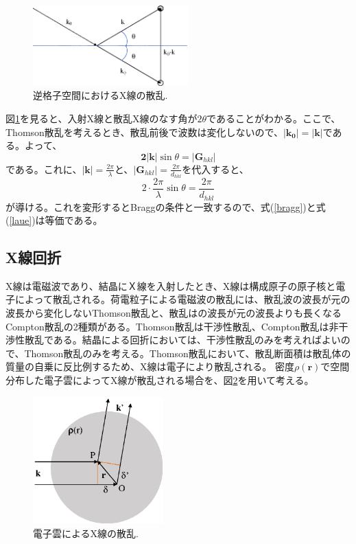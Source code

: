 \documentclass[11pt,a4j,uplatex]{jsarticle}
\begin{document}
\begin{figure}[htb]
 \centering
 \includegraphics[clip,width=6cm]{hasuu.eps}
 \caption{逆格子空間におけるX線の散乱.}
 \label{hasuu}
\end{figure}

\newpage%
図\ref{hasuu}を見ると、入射X線と散乱X線のなす角が$2\theta$であることがわかる。ここで、Thomson散乱を考えるとき、散乱前後で波数は変化しないので、$\bm{|k_0|=|k|}$である。よって、
\begin{equation}
 \bm{2|k|}\sin\theta=|\bm{G}_{hkl}|
 \nonumber
\end{equation}
である。これに、$\bm{|k|}=\frac{2\pi}{\lambda}$と、$|\bm{G}_{hkl}|=\frac{2\pi}{d_{hkl}}$を代入すると、
\begin{equation}
 2\cdot\frac{2\pi}{\lambda}\sin\theta=\frac{2\pi}{d_{hkl}}
 \nonumber
\end{equation}
が導ける。これを変形するとBraggの条件と一致するので、式(\ref{bragg})と式(\ref{laue})は等価である。
\fi

\newpage
\subsection{X線回折}%
X線は電磁波であり、結晶にＸ線を入射したとき、X線は構成原子の原子核と電子によって散乱される。荷電粒子による電磁波の散乱には、散乱波の波長が元の波長から変化しないThomson散乱と、散乱はの波長が元の波長よりも長くなるCompton散乱の2種類がある。Thomson散乱は干渉性散乱、Compton散乱は非干渉性散乱である。結晶による回折においては、干渉性散乱のみを考えればよいので、Thomson散乱のみを考える。Thomson散乱において、散乱断面積は散乱体の質量の自乗に反比例するため、X線は電子により散乱される。
密度$\rho(\bm{r})$で空間分布した電子雲によってX線が散乱される場合を、図\ref{sanran}を用いて考える。
\begin{figure}[htb]
 \centering
 \includegraphics[clip,width=5cm]{sanran.eps}
 \caption{電子雲によるX線の散乱.}
 \label{sanran}
\end{figure}
\end{document}
